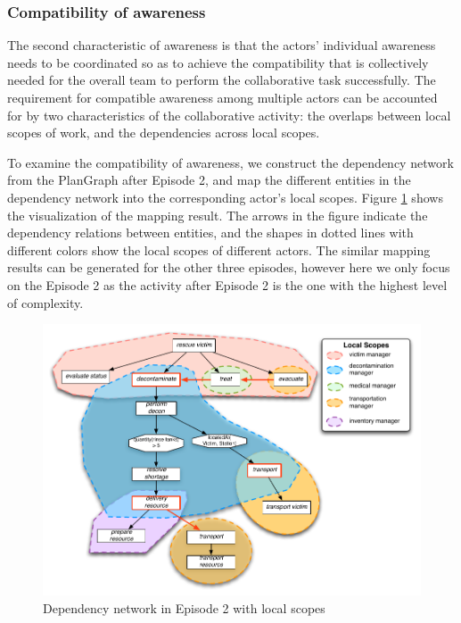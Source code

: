 \subsubsection{Compatibility of awareness} %
\label{ssub:compatibility_of_awareness}
The second characteristic of awareness is that the actors' individual awareness needs to be coordinated so as to achieve the compatibility that is collectively needed for the overall team to perform the collaborative task successfully. The requirement for compatible awareness among multiple actors can be accounted for by two characteristics of the collaborative activity: the overlaps between local scopes of work, and the dependencies across local scopes.

To examine the compatibility of awareness, we construct the dependency network from the PlanGraph after Episode 2, and map the different entities in the dependency network into the corresponding actor's local scopes. Figure \ref{fig:dependencies_ep2} shows the visualization of the mapping result. The arrows in the figure indicate the dependency relations between entities, and the shapes in dotted lines with different colors show the local scopes of different actors. The similar mapping results can be generated for the other three episodes, however here we only focus on the Episode 2 as the activity after Episode 2 is the one with the highest level of complexity.

\begin{figure}[htbp] %
	\centering
	\includegraphics[width=5.8in]{dependencies_ep2.pdf} 
	\caption{Dependency network in Episode 2 with local scopes}
	\label{fig:dependencies_ep2}
\end{figure}


